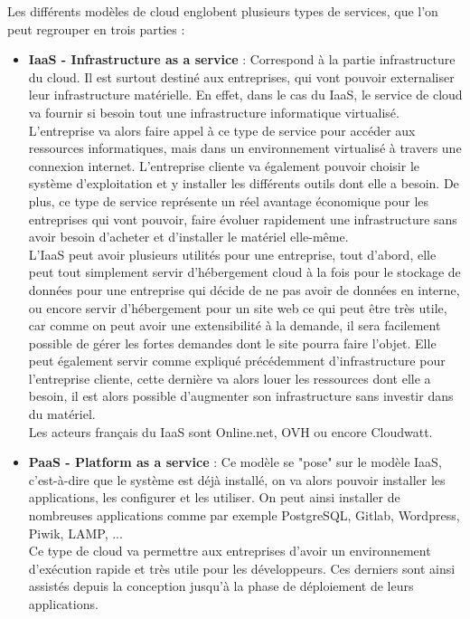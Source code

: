 \documentclass[]{article}
\begin{document}
Les différents modèles de cloud englobent plusieurs types de services,
que l'on peut regrouper en trois parties :
\begin{itemize}
\item  \textbf{IaaS - Infrastructure as a service} : Correspond à la partie infrastructure du cloud. Il est surtout destiné aux entreprises, qui vont pouvoir externaliser leur infrastructure matérielle. En effet, dans le cas du IaaS, le service de cloud va fournir si besoin tout une infrastructure informatique virtualisé.\\
L'entreprise va alors faire appel à ce type de service pour accéder aux ressources informatiques, mais dans un environnement virtualisé à travers une connexion internet. L'entreprise cliente va également pouvoir choisir le système d'exploitation et y installer les différents outils dont elle a besoin. De plus, ce type de service représente un réel avantage économique pour les entreprises qui vont pouvoir, faire évoluer rapidement une infrastructure sans avoir besoin d'acheter et d'installer le matériel elle-même.\\
L'IaaS peut avoir plusieurs utilités pour une entreprise, tout d'abord, elle peut tout simplement servir d'hébergement cloud à la fois pour le stockage de données pour une entreprise qui décide de ne pas avoir de données en interne, ou encore servir d'hébergement pour un site web ce qui peut être très utile, car comme on peut avoir une extensibilité à la demande, il sera facilement possible de gérer les fortes demandes dont le site pourra faire l'objet. Elle peut également servir comme expliqué précédemment d'infrastructure pour l'entreprise cliente, cette dernière va alors louer les ressources dont elle a besoin, il est alors possible d'augmenter son infrastructure sans investir dans du matériel.\\
Les acteurs français du IaaS sont Online.net, OVH ou encore Cloudwatt.
\item \textbf{PaaS - Platform as a service }: Ce modèle se "pose" sur le modèle IaaS, c'est-à-dire que le système est déjà installé, on va alors pouvoir installer les applications, les configurer et les utiliser. On peut ainsi installer de nombreuses applications comme par exemple PostgreSQL, Gitlab, Wordpress, Piwik, LAMP, ...\\
Ce type de cloud va permettre aux entreprises d'avoir un environnement d'exécution rapide et très utile pour les développeurs. Ces derniers sont ainsi assistés depuis la conception jusqu'à la phase de déploiement de leurs applications.\\

\end{itemize}
\end{document}
